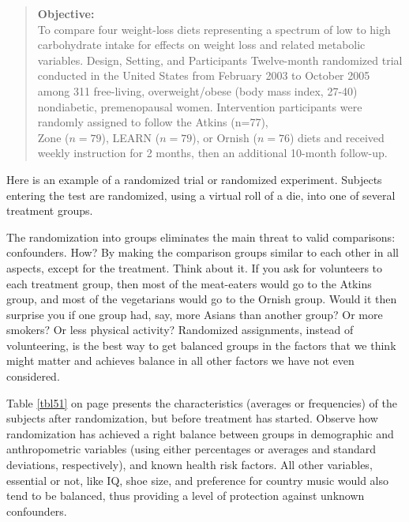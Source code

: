 \documentclass[11pt]{book}\usepackage[]{graphicx}\usepackage[]{color}
\begin{document}
\begin{quotation}
 \textbf{Objective:} \\ To compare four weight-loss diets representing a spectrum of low to high carbohydrate intake for effects on weight loss and related metabolic variables. Design, Setting, and Participants Twelve-month randomized trial conducted in the United States from February 2003 to October 2005 among 311 free-living, overweight/obese (body mass index, 27-40) nondiabetic, premenopausal women.  Intervention participants were randomly assigned to follow the Atkins (n=77), \\ Zone ($n = 79$), LEARN ($n = 79$), or Ornish ($n = 76$) diets and received weekly instruction for 2 months, then an additional 10-month follow-up.
\end{quotation}

Here is an example of a randomized trial or randomized experiment.   Subjects entering the test are randomized, using a virtual roll of a die, into one of several treatment groups.

The randomization into groups eliminates the main threat to valid comparisons: \\ confounders.  How?  By making the comparison groups similar to each other in all aspects, except for the treatment.  Think about it.  If you ask for volunteers to each treatment group, then most of the meat-eaters would go to the Atkins group, and most of the vegetarians would go to the Ornish group.   Would it then surprise you if one group had, say, more Asians than another group?  Or more smokers?  Or less physical activity?  Randomized assignments, instead of volunteering, is the best way to get balanced groups in the factors that we think might matter and achieves balance in all other factors we have not even considered.

Table \ref{tbl51} on page \pageref{tbl51} presents the characteristics (averages or frequencies) of the subjects after randomization, but before treatment has started.  Observe how randomization has achieved a right balance between groups in demographic and anthropometric variables (using either percentages or averages and standard deviations, respectively), and known health risk factors.  All other variables, essential or not, like IQ, shoe size, and preference for country music would also tend to be balanced, thus providing a level of protection against unknown confounders.

\end{document}
